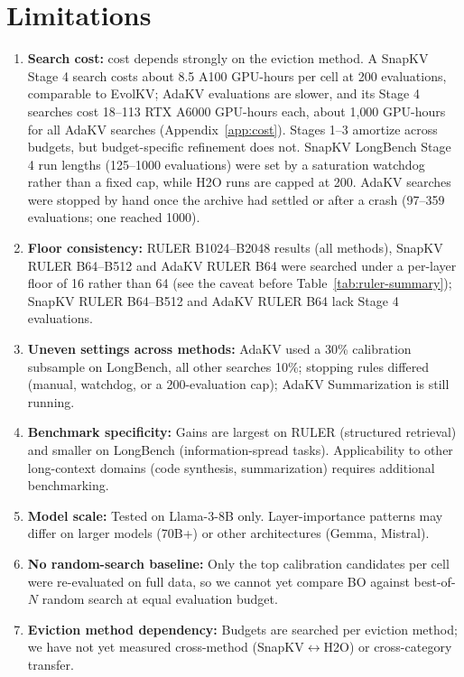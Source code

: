 \documentclass[11pt]{article}
\begin{document}
\section{Limitations}

\begin{enumerate}
\item \textbf{Search cost:} cost depends strongly on the eviction method. A SnapKV Stage 4 search costs about 8.5 A100 GPU-hours per cell at 200 evaluations, comparable to EvolKV; AdaKV evaluations are slower, and its Stage 4 searches cost 18--113 RTX A6000 GPU-hours each, about 1{,}000 GPU-hours for all AdaKV searches (Appendix~\ref{app:cost}). Stages 1--3 amortize across budgets, but budget-specific refinement does not. SnapKV LongBench Stage 4 run lengths (125--1000 evaluations) were set by a saturation watchdog rather than a fixed cap, while H2O runs are capped at 200. AdaKV searches were stopped by hand once the archive had settled or after a crash (97--359 evaluations; one reached 1000).
\item \textbf{Floor consistency:} RULER B1024--B2048 results (all methods), SnapKV RULER B64--B512 and AdaKV RULER B64 were searched under a per-layer floor of 16 rather than 64 (see the caveat before Table~\ref{tab:ruler-summary}); SnapKV RULER B64--B512 and AdaKV RULER B64 lack Stage 4 evaluations.
\item \textbf{Uneven settings across methods:} AdaKV used a 30\% calibration subsample on LongBench, all other searches 10\%; stopping rules differed (manual, watchdog, or a 200-evaluation cap); AdaKV Summarization is still running.
\item \textbf{Benchmark specificity:} Gains are largest on RULER (structured retrieval) and smaller on LongBench (information-spread tasks). Applicability to other long-context domains (code synthesis, summarization) requires additional benchmarking.
\item \textbf{Model scale:} Tested on Llama-3-8B only. Layer-importance patterns may differ on larger models (70B+) or other architectures (Gemma, Mistral).
\item \textbf{No random-search baseline:} Only the top calibration candidates per cell were re-evaluated on full data, so we cannot yet compare BO against best-of-$N$ random search at equal evaluation budget.
\item \textbf{Eviction method dependency:} Budgets are searched per eviction method; we have not yet measured cross-method (SnapKV$\leftrightarrow$H2O) or cross-category transfer.
\end{enumerate}
\end{document}
